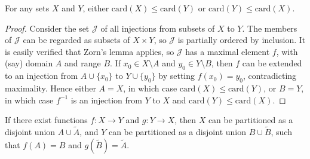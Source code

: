 \begin{prop}
For any sets $X$ and $Y$, either $\mathrm{card}(X) \leq \mathrm{card}(Y)$ or 
$\mathrm{card}(Y) \leq \mathrm{card}(X)$.
\end{prop}

\begin{proof}
Consider the set $\mathcal{J}$ of all injections from subsets of $X$ to $Y$. 
The members of $\mathcal{J}$ can be regarded as subsets of $X \times Y$, so 
$\mathcal{J}$ is partially ordered by inclusion. It is easily verified that 
Zorn's lemma applies, so $\mathcal{J}$ has a maximal element $f$, with (say) 
domain $A$ and range $B$. If $x_0 \in X \setminus A$ and $y_0 \in Y \setminus B$, 
then $f$ can be extended to an injection from $A \cup \{x_0\}$ to 
$Y \cup \{y_0\}$ by setting $f(x_0) = y_0$, contradicting maximality. 
Hence either $A = X$, in which case $\mathrm{card}(X) \leq \mathrm{card}(Y)$, 
or $B = Y$, in which case $f^{-1}$ is an injection from $Y$ to $X$ and 
$\mathrm{card}(Y) \leq \mathrm{card}(X)$.
\end{proof}

\begin{thm}\label{5dd1cdb2}
    If there exist functions $f: X \to Y$ and $g: Y \to X$, then $X$ can be partitioned as a disjoint union $A \cup \tilde{A}$, and 
    $Y$ can be partitioned as a disjoint union $B \cup \tilde{B}$, such that $f(A) = B$ and $g(\tilde{B}) = \tilde{A}$.
\end{thm}

